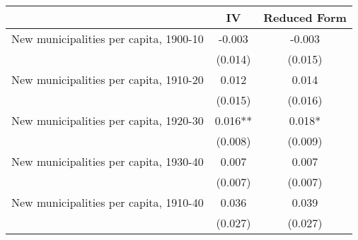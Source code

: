  \begin{tabular}{l*{2}{c}} \toprule
                &\multicolumn{1}{c}{IV}&\multicolumn{1}{c}{Reduced Form}\\
\midrule
New municipalities per capita, 1900-10&   -0.003   &   -0.003   \\
                &  (0.014)   &  (0.015)   \\
\addlinespace
New municipalities per capita, 1910-20&    0.012   &    0.014   \\
                &  (0.015)   &  (0.016)   \\
\addlinespace
New municipalities per capita, 1920-30&    0.016** &    0.018*  \\
                &  (0.008)   &  (0.009)   \\
\addlinespace
New municipalities per capita, 1930-40&    0.007   &    0.007   \\
                &  (0.007)   &  (0.007)   \\
\addlinespace
New municipalities per capita, 1910-40&    0.036   &    0.039   \\
                &  (0.027)   &  (0.027)   \\
 \bottomrule \end{tabular}
